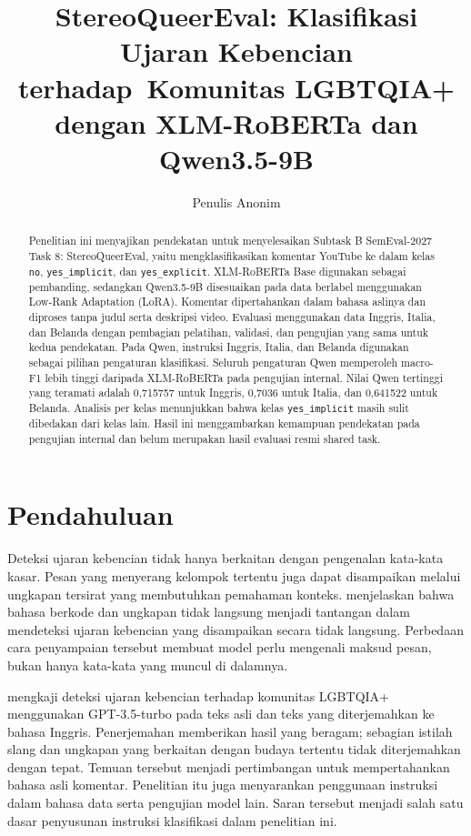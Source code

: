 \documentclass[11pt]{article}
\title{StereoQueerEval: Klasifikasi Ujaran Kebencian terhadap\
Komunitas LGBTQIA+ dengan XLM-RoBERTa dan Qwen3.5-9B}
\author{Penulis Anonim}
\begin{document}
\nolinenumbers
\raggedbottom
\maketitle
\begin{abstract}
Penelitian ini menyajikan pendekatan untuk menyelesaikan Subtask B SemEval-2027 Task 8: StereoQueerEval, yaitu mengklasifikasikan komentar YouTube ke dalam kelas \texttt{no}, \texttt{yes\_implicit}, dan \texttt{yes\_explicit}. XLM-RoBERTa Base digunakan sebagai pembanding, sedangkan Qwen3.5-9B disesuaikan pada data berlabel menggunakan Low-Rank Adaptation (LoRA). Komentar dipertahankan dalam bahasa aslinya dan diproses tanpa judul serta deskripsi video. Evaluasi menggunakan data Inggris, Italia, dan Belanda dengan pembagian pelatihan, validasi, dan pengujian yang sama untuk kedua pendekatan. Pada Qwen, instruksi Inggris, Italia, dan Belanda digunakan sebagai pilihan pengaturan klasifikasi. Seluruh pengaturan Qwen memperoleh macro-F1 lebih tinggi daripada XLM-RoBERTa pada pengujian internal. Nilai Qwen tertinggi yang teramati adalah 0,715757 untuk Inggris, 0,7036 untuk Italia, dan 0,641522 untuk Belanda. Analisis per kelas menunjukkan bahwa kelas \texttt{yes\_implicit} masih sulit dibedakan dari kelas lain. Hasil ini menggambarkan kemampuan pendekatan pada pengujian internal dan belum merupakan hasil evaluasi resmi shared task.
\end{abstract}

\section{Pendahuluan}
\label{sec:pendahuluan}
Deteksi ujaran kebencian tidak hanya berkaitan dengan pengenalan kata-kata kasar. Pesan yang menyerang kelompok tertentu juga dapat disampaikan melalui ungkapan tersirat yang membutuhkan pemahaman konteks. \citet{elsherief-etal-2021-latent} menjelaskan bahwa bahasa berkode dan ungkapan tidak langsung menjadi tantangan dalam mendeteksi ujaran kebencian yang disampaikan secara tidak langsung. Perbedaan cara penyampaian tersebut membuat model perlu mengenali maksud pesan, bukan hanya kata-kata yang muncul di dalamnya.

\citet{chan-etal-2024-hate} mengkaji deteksi ujaran kebencian terhadap komunitas LGBTQIA+ menggunakan GPT-3.5-turbo pada teks asli dan teks yang diterjemahkan ke bahasa Inggris. Penerjemahan memberikan hasil yang beragam; sebagian istilah slang dan ungkapan yang berkaitan dengan budaya tertentu tidak diterjemahkan dengan tepat. Temuan tersebut menjadi pertimbangan untuk mempertahankan bahasa asli komentar. Penelitian itu juga menyarankan penggunaan instruksi dalam bahasa data serta pengujian model lain. Saran tersebut menjadi salah satu dasar penyusunan instruksi klasifikasi dalam penelitian ini.
\end{document}

